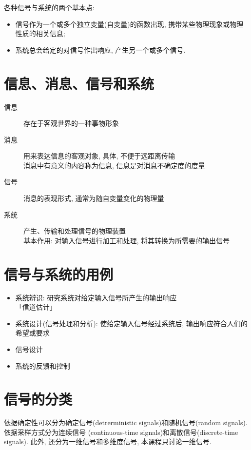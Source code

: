     各种信号与系统的两个基本点:

    \begin{itemize}
        \item 信号作为一个或多个独立变量(自变量)的函数出现, 携带某些物理现象或物理性质的相关信息;
        \item 系统总会给定的对信号作出响应, 产生另一个或多个信号.
    \end{itemize}

\section{信息、消息、信号和系统}

    \begin{description}
        \item[信息] 存在于客观世界的一种事物形象
        \item[消息] 用来表达信息的客观对象, 具体, 不便于远距离传输 \\
            消息中有意义的内容称为信息, 信息是对消息不确定度的度量
        \item[信号] 消息的表现形式, 通常为随自变量变化的物理量
        \item[系统] 产生、传输和处理信号的物理装置 \\
            基本作用: 对输入信号进行加工和处理, 将其转换为所需要的输出信号
    \end{description}

\section{信号与系统的用例}

    \begin{itemize}
        \item 系统辨识: 研究系统对给定输入信号所产生的输出响应 \\
            「信道估计」
        \item 系统设计(信号处理和分析): 使给定输入信号经过系统后, 输出响应符合人们的希望或要求    
        \item 信号设计
        \item 系统的反馈和控制
    \end{itemize}

\section{信号的分类}

    依据确定性可以分为确定信号(detrerministic signals)和随机信号(random signals). 依据采样方式分为连续信号 (continuous-time signals)和离散信号(discrete-time signals). 此外, 还分为一维信号和多维度信号, 本课程只讨论一维信号.

